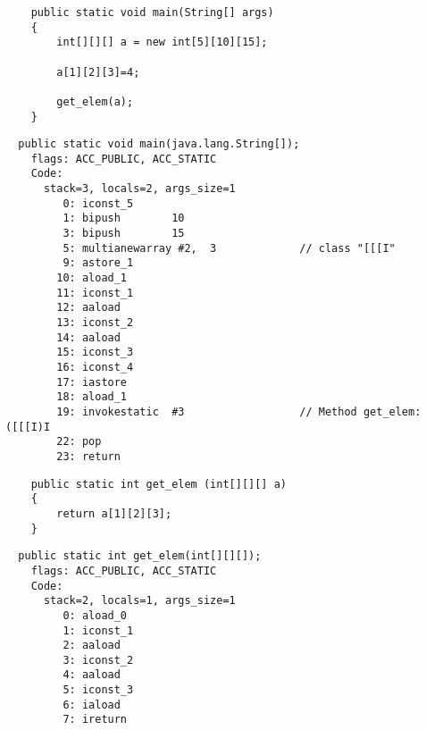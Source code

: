 \subsubsection{}


\begin{lstlisting}
	public static void main(String[] args)
	{
		int[][][] a = new int[5][10][15];

		a[1][2][3]=4;

		get_elem(a);
	}
\end{lstlisting}

\begin{lstlisting}
  public static void main(java.lang.String[]);
    flags: ACC_PUBLIC, ACC_STATIC
    Code:
      stack=3, locals=2, args_size=1
         0: iconst_5      
         1: bipush        10
         3: bipush        15
         5: multianewarray #2,  3             // class "[[[I"
         9: astore_1      
        10: aload_1       
        11: iconst_1      
        12: aaload        
        13: iconst_2      
        14: aaload        
        15: iconst_3      
        16: iconst_4      
        17: iastore       
        18: aload_1       
        19: invokestatic  #3                  // Method get_elem:([[[I)I
        22: pop           
        23: return        
\end{lstlisting}


\begin{lstlisting}
	public static int get_elem (int[][][] a)
	{
		return a[1][2][3];
	}
\end{lstlisting}

\begin{lstlisting}
  public static int get_elem(int[][][]);
    flags: ACC_PUBLIC, ACC_STATIC
    Code:
      stack=2, locals=1, args_size=1
         0: aload_0       
         1: iconst_1      
         2: aaload        
         3: iconst_2      
         4: aaload        
         5: iconst_3      
         6: iaload        
         7: ireturn       
\end{lstlisting}
